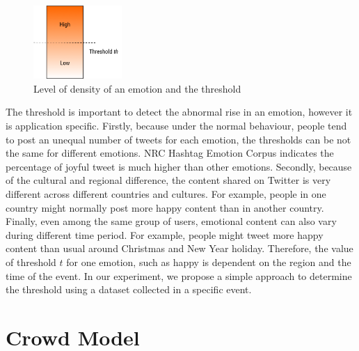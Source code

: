 \begin{figure}[htb!] 
\centering    
\includegraphics[width=0.3\textwidth]{LevelOfEmotion}
\caption{Level of density of an emotion and the threshold}
\label{fig:levelOfDensity}
\end{figure}

The threshold is important to detect the abnormal rise in an emotion, however it is application specific. Firstly, because under the normal behaviour, people tend to post an unequal number of tweets for each emotion, the thresholds can be not the same for different emotions. NRC Hashtag Emotion Corpus \citep{mohammad2014using} indicates the percentage of joyful tweet is much higher than other emotions. Secondly, because of the cultural and regional difference, the content shared on Twitter is very different across different countries and cultures. For example, people in one country might normally post more happy content than in another country. Finally, even among the same group of users, emotional content can also vary during different time period. For example, people might tweet more happy content than usual around Christmas and New Year holiday. Therefore, the value of threshold \(t\) for one emotion, such as happy is dependent on the region and the time of the event. In our experiment, we propose a simple approach to determine the threshold using a dataset collected in a specific event.

\section{Crowd Model}

